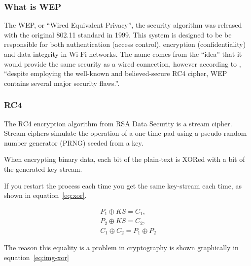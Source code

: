 \documentclass[pdftex, 12pt, a4paper]{article}
\begin{document}
\subsubsection{What is WEP}
The WEP, or ``Wired Equivalent Privacy'', the security algorithm was released with the original 802.11 standard in 1999\cite{802.11}.  This system is designed to be be responsible for both authentication (access control), encryption (confidentiality) and data integrity in Wi-Fi networks. The name comes from the ``idea'' that it would provide the same security as a wired connection, however according to \textcite{intercepting-wifi}, ``despite employing the well-known and believed-secure RC4 cipher, WEP contains several major security flaws.''.

\subsubsection{RC4}
The RC4 encryption algorithm from RSA Data Security is a stream cipher. Stream ciphers simulate the operation of a one-time-pad using a pseudo random number generator (PRNG) seeded from a key\cite{otp-faq}.

When encrypting binary data, each bit of the plain-text is XORed with a bit of the generated key-stream.

If you restart the process each time you get the same key-stream each time, as shown in equation~\ref{eq:xor}.

\begin{subequations}
    \begin{align}
        P_1 \oplus KS = C_1,\\
        P_2 \oplus KS = C_2,\\
        C_1 \oplus C_2 = P_1 \oplus P_2\label{eq:xor}
    \end{align}
\end{subequations}

The reason this equality is a problem in cryptography is shown graphically in equation~\ref{eq:img-xor}
\end{document}
